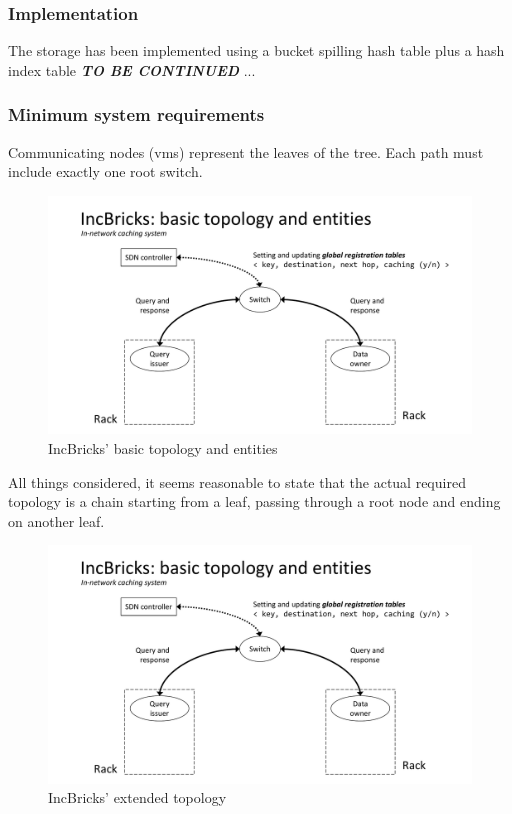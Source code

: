 \subsubsection{Implementation}
The storage has been implemented using a bucket spilling hash table plus a hash index table
\textbf{\textit{TO BE CONTINUED}} ...

\subsubsection{Minimum system requirements}
Communicating nodes (\glspl{vm}) represent the leaves of the tree.
Each path must include exactly one root switch.

\begin{figure}[!htb]
    \centering
        \includegraphics[page=1, clip, trim=3.6cm 0.7cm 2.5cm 4.15cm, width=1.00\textwidth]{figures/analysis/inp/solutions.pdf}
    \caption{IncBricks' \texorpdfstring{\cite{incbricks}}{} basic topology and entities}
\end{figure}

All things considered, it seems reasonable to state that the actual required topology is a chain starting from a leaf, passing through a root node and ending on another leaf.

\begin{figure}[!htb]
    \centering
        \includegraphics[page=2, clip, trim=3.6cm 0.7cm 2.5cm 4.15cm, width=1.00\textwidth]{figures/analysis/inp/solutions.pdf}
    \caption{IncBricks' \texorpdfstring{\cite{incbricks}}{} extended topology}
\end{figure}

